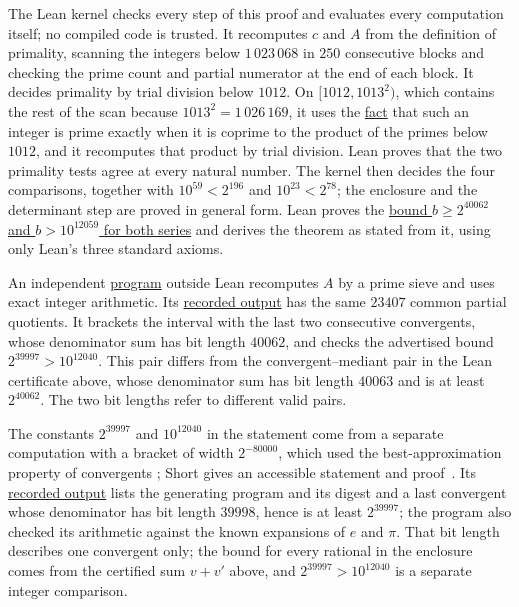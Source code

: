 The Lean kernel checks every step of this proof and evaluates every
computation itself; no compiled code is trusted.  It recomputes $c$ and
$A$ from the definition of primality, scanning the integers below
$1\,023\,068$ in $250$ consecutive blocks and checking the prime count and
partial numerator at the end of each block.  It decides primality by trial
division below $1012$.  On $[1012,1013^2)$, which contains the rest of the
scan because $1013^2=1\,026\,169$, it uses the
\href{https://github.com/wcook04/plectis-erdos/blob/e6c2d8f77ac24753c5216a49f4daf7f7388b309f/verification/Erdos251LargeCertificate/ErdosProblems/Erdos251/GcdPrimality.lean\#L72}{fact}
that such an integer is prime exactly when it is coprime to the product of the
primes below $1012$, and it recomputes that product by trial division.  Lean
proves that the two primality tests agree at every natural number.  The kernel
then decides the four comparisons, together with $10^{59}<2^{196}$ and
$10^{23}<2^{78}$; the enclosure and the determinant step are proved in
general form.  Lean proves the
\href{https://github.com/wcook04/plectis-erdos/blob/e6c2d8f77ac24753c5216a49f4daf7f7388b309f/verification/Erdos251LargeCertificate/ErdosProblems/Erdos251/PaperLargeStreamingV5.lean\#L76}{bound $b\ge2^{40062}$ and $b>10^{12059}$ for both series}
and derives the theorem as stated from it, using only Lean's three
standard axioms.

An independent
\href{https://github.com/wcook04/plectis-erdos/blob/beaf0866976c908539fba0a96075374dd658f44a/research/experiments/erdos251/exact_replay.py}{program}
outside Lean recomputes $A$ by a prime sieve and uses exact integer
arithmetic.  Its \href{https://github.com/wcook04/plectis-erdos/blob/beaf0866976c908539fba0a96075374dd658f44a/research/experiments/erdos251/receipts/251-exact-replay.json}{recorded output}
has the same $23407$ common partial quotients.  It brackets the interval
with the last two consecutive convergents, whose denominator sum has
bit length $40062$, and checks the advertised bound $2^{39997}>10^{12040}$.
This pair differs from the convergent--mediant pair in the Lean certificate
above, whose denominator sum has bit length $40063$ and is at least
$2^{40062}$.  The two bit lengths refer to different valid pairs.

The constants $2^{39997}$ and $10^{12040}$ in the statement come from a
separate computation with a bracket of width $2^{-80000}$, which used the best-approximation property of
convergents \cite[\S6, Theorems~16 and~17]{khinchin1964}; Short gives an
accessible statement and proof~\cite[Theorem~1.1]{short2009}.  Its
\href{https://github.com/wcook04/plectis-erdos/blob/dd6cc708f650f061de06594eba6ba43878f4de31/research/experiments/erdos251/receipts/certified-cf.json}{recorded output}
lists the generating program and its digest and a last convergent whose
denominator has bit length $39998$, hence is at least $2^{39997}$; the
program also checked its arithmetic against the known expansions of $e$
and $\pi$.  That bit length describes one convergent only; the bound for
every rational in the enclosure comes from the certified sum $v+v'$
above, and $2^{39997}>10^{12040}$ is a separate integer comparison.

